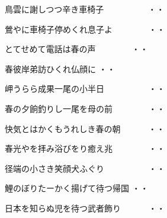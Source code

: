 \vspace{0.6cm}
\begin{shiika}鳥雲に謝しつつ辛き車椅子　　　　　
\hfill{・・}\end{shiika}
\vspace{0.6cm}
\begin{shiika}鶯やに車椅子停めくれ息子よ　　　　
\hfill{・・}\end{shiika}
\vspace{0.6cm}
\begin{shiika}とてせめて電話は春の声　　　　
\hfill{・・}\end{shiika}
\vspace{0.6cm}
\begin{shiika}春彼岸弟訪ひくれ仏顔に
\hfill{・・}\end{shiika}
\vspace{0.6cm}
\begin{shiika}岬うらら成果一尾の小半日　　　　　
\hfill{・・}\end{shiika}
\vspace{0.6cm}
\begin{shiika}春の夕餉釣りし一尾を母の前　　　　
\hfill{・・}\end{shiika}
\vspace{0.6cm}
\begin{shiika}快気とはかくもうれしき春の朝　　　
\hfill{・・}\end{shiika}
\vspace{0.6cm}
\begin{shiika}春光やを拝み浴びをり癒え兆　　　　
\hfill{・・}\end{shiika}
\vspace{0.6cm}
\begin{shiika}径端の小さき笑顔犬ふぐり　　　　　
\hfill{・・}\end{shiika}
\vspace{0.6cm}
\begin{shiika}鯉のぼりたーかく揚げて待つ帰国
\hfill{・・}\end{shiika}
\vspace{0.6cm}
\begin{shiika}日本を知らぬ児を待つ武者飾り　　　
\hfill{・・}\end{shiika}

